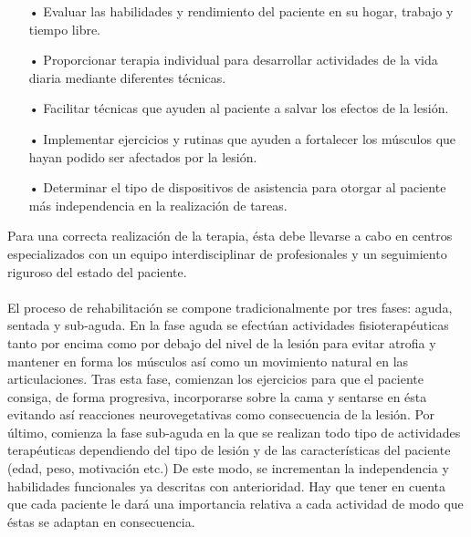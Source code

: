 \begin{itemize}
\item[•] Evaluar las habilidades y rendimiento del paciente en su hogar, trabajo y tiempo libre.
\item[•] Proporcionar terapia individual para desarrollar actividades de la vida diaria mediante diferentes técnicas.
\item[•] Facilitar técnicas que ayuden al paciente a salvar los efectos de la lesión.
\item[•] Implementar ejercicios y rutinas que ayuden a fortalecer los músculos que hayan podido ser afectados por la lesión.
\item[•] Determinar el tipo de dispositivos de asistencia para otorgar al paciente más independencia en la realización de tareas.
\end{itemize}


Para una correcta realización de la terapia, ésta debe llevarse a cabo en centros especializados con un equipo interdisciplinar de profesionales y un seguimiento riguroso del estado del paciente.
\\
\\
El proceso de rehabilitación se compone tradicionalmente por tres fases: aguda, sentada y sub-aguda. En la fase aguda se efectúan actividades fisioterapéuticas tanto por encima como por debajo del nivel de la lesión para evitar atrofia y mantener en forma los músculos así como un movimiento natural en las articulaciones. Tras esta fase, comienzan los ejercicios para que el paciente consiga, de forma progresiva, incorporarse sobre la cama y sentarse en ésta evitando así reacciones neurovegetativas como consecuencia de la lesión. Por último, comienza la fase sub-aguda en la que se realizan todo tipo de actividades terapéuticas dependiendo del tipo de lesión y de las características del paciente (edad, peso, motivación etc.) De este modo, se incrementan la independencia y habilidades funcionales ya descritas con anterioridad. Hay que tener en cuenta que cada paciente le dará una importancia relativa a cada actividad de modo que éstas se adaptan en consecuencia\cite{tesis_antonio}\cite{etapas_rehabilitacion}.


